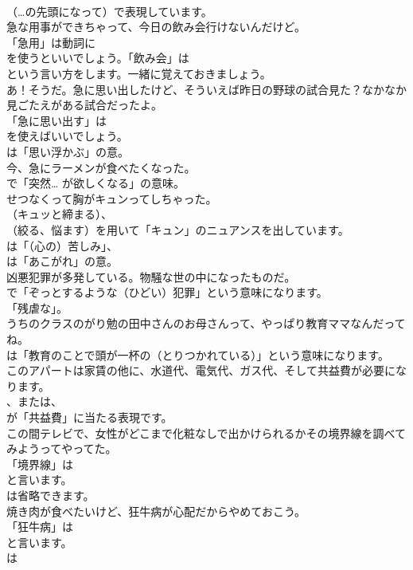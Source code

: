 \documentclass[8pt]{extreport}
\begin{document}
\begin{CJK}{UTF8}{min}
\\	（…の先頭になって）で表現しています。	
\\	急な用事ができちゃって、今日の飲み会行けないんだけど。 
\\	「急用」は動詞に
\\	を使うといいでしょう。「飲み会」は
\\	という言い方をします。一緒に覚えておきましょう。	
\\	あ！そうだ。急に思い出したけど、そういえば昨日の野球の試合見た？なかなか見ごたえがある試合だったよ。 
\\	「急に思い出す」は 
\\	を使えばいいでしょう。
\\	は「思い浮かぶ」の意。	
\\	今、急にラーメンが食べたくなった。 
\\	で「突然… が欲しくなる」の意味。	
\\	せつなくって胸がキュンってしちゃった。 
\\	（キュッと締まる）、
\\	（絞る、悩ます）を用いて「キュン」のニュアンスを出しています。
\\	は「（心の）苦しみ」、
\\	は「あこがれ」の意。	
\\	凶悪犯罪が多発している。物騒な世の中になったものだ。 
\\	で「ぞっとするような（ひどい）犯罪」という意味になります。
\\	「残虐な」。	
\\	うちのクラスのがり勉の田中さんのお母さんって、やっぱり教育ママなんだってね。 
\\	は「教育のことで頭が一杯の（とりつかれている）」という意味になります。	
\\	このアパートは家賃の他に、水道代、電気代、ガス代、そして共益費が必要になります。 
\\	、または、
\\	が「共益費」に当たる表現です。	
\\	この間テレビで、女性がどこまで化粧なしで出かけられるかその境界線を調べてみようってやってた。 
\\	「境界線」は 
\\	と言います。
\\	は省略できます。	
\\	焼き肉が食べたいけど、狂牛病が心配だからやめておこう。 
\\	「狂牛病」は 
\\	と言います。
\\	は 

\end{CJK}
\end{document}

